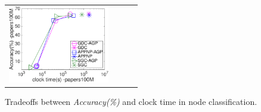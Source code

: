 \begin{figure}[t]
\begin{tabular}{cccc}
			\hspace{-4mm} \includegraphics[height=34mm]{./Figs/GNN-accuracy-clock-papers100M.eps} 
		\end{tabular}
		\vspace{-5mm}
		\caption{Tradeoffs between {\em Accuracy(\%)} and clock time in node classification.}
		\label{fig:GNN-accuracy-clock-time}
		\vspace{-1mm}
\end{figure}





